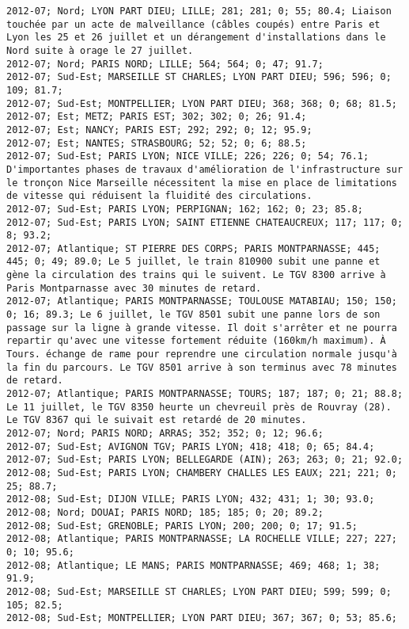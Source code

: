 \documentclass{article}
\begin{document}
\begin{Verbatim}[commandchars=\\\{\}]
2012-07; Nord; LYON PART DIEU; LILLE; 281; 281; 0; 55; 80.4; Liaison touchée par un acte de malveillance (câbles coupés) entre Paris et Lyon les 25 et 26 juillet et un dérangement d'installations dans le Nord suite à orage le 27 juillet.
2012-07; Nord; PARIS NORD; LILLE; 564; 564; 0; 47; 91.7; 
2012-07; Sud-Est; MARSEILLE ST CHARLES; LYON PART DIEU; 596; 596; 0; 109; 81.7; 
2012-07; Sud-Est; MONTPELLIER; LYON PART DIEU; 368; 368; 0; 68; 81.5; 
2012-07; Est; METZ; PARIS EST; 302; 302; 0; 26; 91.4; 
2012-07; Est; NANCY; PARIS EST; 292; 292; 0; 12; 95.9; 
2012-07; Est; NANTES; STRASBOURG; 52; 52; 0; 6; 88.5; 
2012-07; Sud-Est; PARIS LYON; NICE VILLE; 226; 226; 0; 54; 76.1; D'importantes phases de travaux d'amélioration de l'infrastructure sur le tronçon Nice Marseille nécessitent la mise en place de limitations de vitesse qui réduisent la fluidité des circulations.
2012-07; Sud-Est; PARIS LYON; PERPIGNAN; 162; 162; 0; 23; 85.8; 
2012-07; Sud-Est; PARIS LYON; SAINT ETIENNE CHATEAUCREUX; 117; 117; 0; 8; 93.2; 
2012-07; Atlantique; ST PIERRE DES CORPS; PARIS MONTPARNASSE; 445; 445; 0; 49; 89.0; Le 5 juillet, le train 810900 subit une panne et gène la circulation des trains qui le suivent. Le TGV 8300 arrive à Paris Montparnasse avec 30 minutes de retard.
2012-07; Atlantique; PARIS MONTPARNASSE; TOULOUSE MATABIAU; 150; 150; 0; 16; 89.3; Le 6 juillet, le TGV 8501 subit une panne lors de son passage sur la ligne à grande vitesse. Il doit s'arrêter et ne pourra repartir qu'avec une vitesse fortement réduite (160km/h maximum). À Tours. échange de rame pour reprendre une circulation normale jusqu'à la fin du parcours. Le TGV 8501 arrive à son terminus avec 78 minutes de retard.
2012-07; Atlantique; PARIS MONTPARNASSE; TOURS; 187; 187; 0; 21; 88.8; Le 11 juillet, le TGV 8350 heurte un chevreuil près de Rouvray (28). Le TGV 8367 qui le suivait est retardé de 20 minutes.
2012-07; Nord; PARIS NORD; ARRAS; 352; 352; 0; 12; 96.6; 
2012-07; Sud-Est; AVIGNON TGV; PARIS LYON; 418; 418; 0; 65; 84.4; 
2012-07; Sud-Est; PARIS LYON; BELLEGARDE (AIN); 263; 263; 0; 21; 92.0; 
2012-08; Sud-Est; PARIS LYON; CHAMBERY CHALLES LES EAUX; 221; 221; 0; 25; 88.7; 
2012-08; Sud-Est; DIJON VILLE; PARIS LYON; 432; 431; 1; 30; 93.0; 
2012-08; Nord; DOUAI; PARIS NORD; 185; 185; 0; 20; 89.2; 
2012-08; Sud-Est; GRENOBLE; PARIS LYON; 200; 200; 0; 17; 91.5; 
2012-08; Atlantique; PARIS MONTPARNASSE; LA ROCHELLE VILLE; 227; 227; 0; 10; 95.6; 
2012-08; Atlantique; LE MANS; PARIS MONTPARNASSE; 469; 468; 1; 38; 91.9; 
2012-08; Sud-Est; MARSEILLE ST CHARLES; LYON PART DIEU; 599; 599; 0; 105; 82.5; 
2012-08; Sud-Est; MONTPELLIER; LYON PART DIEU; 367; 367; 0; 53; 85.6; 

\end{Verbatim}
\end{document}
